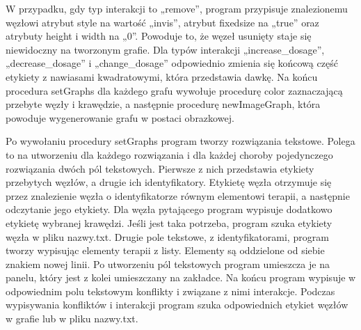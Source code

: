 W przypadku, gdy typ interakcji to „remove”, program przypisuje znalezionemu węzłowi atrybut style na wartość „invis”, atrybut fixedsize na „true” oraz atrybuty height i width na „0”. Powoduje to, że węzeł usunięty staje się niewidoczny na tworzonym grafie. Dla typów interakcji „increase\_dosage”, „decrease\_dosage” i „change\_dosage” odpowiednio zmienia się końcową część etykiety z nawiasami kwadratowymi, która przedstawia dawkę. Na końcu procedura setGraphs dla każdego grafu wywołuje procedurę color zaznaczającą przebyte węzły i krawędzie, a następnie procedurę newImageGraph, która powoduje wygenerowanie grafu w postaci obrazkowej. 

Po wywołaniu procedury setGraphs program tworzy rozwiązania tekstowe. Polega to na utworzeniu dla każdego rozwiązania i dla każdej choroby pojedynczego rozwiązania dwóch pól tekstowych. Pierwsze z nich przedstawia etykiety przebytych węzłów, a drugie ich identyfikatory. 
Etykietę węzła otrzymuje się przez znalezienie węzła o identyfikatorze równym elementowi terapii, a następnie odczytanie jego etykiety. Dla węzła pytającego program wypisuje dodatkowo etykietę wybranej krawędzi. Jeśli jest taka potrzeba, program szuka etykiety węzła w pliku nazwy.txt. Drugie pole tekstowe, z identyfikatorami, program tworzy wypisując elementy terapii z listy. Elementy są oddzielone od siebie znakiem nowej linii. 
Po utworzeniu pól tekstowych program umieszcza je na panelu, który jest z kolei umieszczany na zakładce. Na końcu program wypisuje w odpowiednim polu tekstowym konflikty i związane z nimi interakcje. Podczas wypisywania konfliktów i interakcji program szuka odpowiednich etykiet węzłów w grafie lub w pliku nazwy.txt. 

